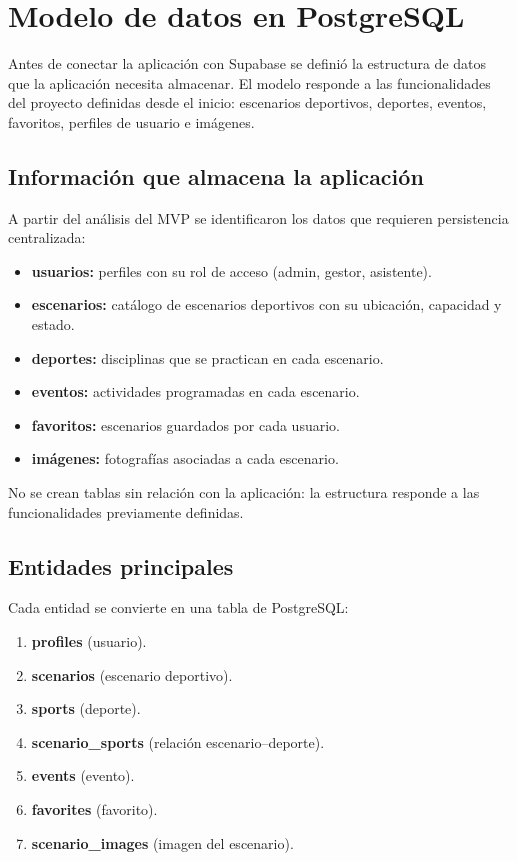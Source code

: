 
\section{Modelo de datos en PostgreSQL}

Antes de conectar la aplicaci\'on con Supabase se defini\'o la estructura
de datos que la aplicaci\'on necesita almacenar. El modelo responde a las
funcionalidades del proyecto definidas desde el inicio: escenarios
deportivos, deportes, eventos, favoritos, perfiles de usuario e
im\'agenes.

\subsection{Informaci\'on que almacena la aplicaci\'on}

A partir del an\'alisis del MVP se identificaron los datos que requieren
persistencia centralizada:

\begin{itemize}
  \item \textbf{usuarios:} perfiles con su rol de acceso (admin, gestor,
    asistente).
  \item \textbf{escenarios:} cat\'alogo de escenarios deportivos con su
    ubicaci\'on, capacidad y estado.
  \item \textbf{deportes:} disciplinas que se practican en cada escenario.
  \item \textbf{eventos:} actividades programadas en cada escenario.
  \item \textbf{favoritos:} escenarios guardados por cada usuario.
  \item \textbf{im\'agenes:} fotograf\'ias asociadas a cada escenario.
\end{itemize}

No se crean tablas sin relaci\'on con la aplicaci\'on: la estructura
responde a las funcionalidades previamente definidas.

\subsection{Entidades principales}

Cada entidad se convierte en una tabla de PostgreSQL:

\begin{enumerate}
  \item \textbf{profiles} (usuario).
  \item \textbf{scenarios} (escenario deportivo).
  \item \textbf{sports} (deporte).
  \item \textbf{scenario\_sports} (relaci\'on escenario--deporte).
  \item \textbf{events} (evento).
  \item \textbf{favorites} (favorito).
  \item \textbf{scenario\_images} (imagen del escenario).
\end{enumerate}


